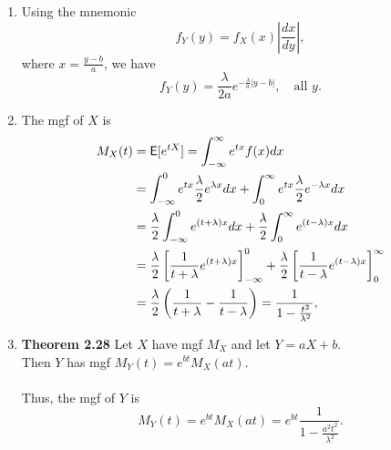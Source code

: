 \documentclass[12pt]{article}
\newcommand{\E}{{\sf E}}
\newenvironment{problem}[2][Problem]{\begin{trivlist}
\item[\hskip \labelsep {\bfseries #1}\hskip \labelsep {\bfseries #2.}]}
{\end{trivlist}}
\begin{document}
\begin{problem}{1}
  \begin{enumerate}
    \item Using the mnemonic
    \[
      f_Y(y) = f_X(x) \left| \frac{dx}{dy} \right|,
    \]
    where $x = \frac{y - b}{a}$, we have
    \[
      f_Y(y) = \frac{\lambda}{2a} e^{-\frac{\lambda}{a} |y - b|}, 
      \quad \text{all } y.
    \]
    \item The mgf of $X$ is 
    \[
      \begin{aligned}
        M_X(t) &= \E[e^{tX}] = \int_{-\infty}^{\infty} e^{tx} f(x) dx \\
        &= \int_{-\infty}^{0} e^{tx} \frac{\lambda}{2} e^{\lambda x} dx + 
        \int_{0}^{\infty} e^{tx} \frac{\lambda}{2} e^{-\lambda x} dx \\
        &= \frac{\lambda}{2} \int_{-\infty}^{0} e^{(t + \lambda)x} dx + 
        \frac{\lambda}{2} \int_{0}^{\infty} e^{(t - \lambda)x} dx \\
        &= \frac{\lambda}{2} \left[ \frac{1}{t + \lambda} 
        e^{(t + \lambda)x} \right]_{-\infty}^{0} + 
        \frac{\lambda}{2} \left[ \frac{1}{t - \lambda} 
        e^{(t - \lambda)x} \right]_{0}^{\infty} \\
        &= \frac{\lambda}{2} \left( \frac{1}{t + \lambda} - 
        \frac{1}{t - \lambda} \right) = \frac{1}{1 - \frac{t^2}{\lambda^2}},
      \end{aligned}
    \]
    \item \textbf{Theorem 2.28} Let $X$ have mgf $M_X$ and let $Y = aX + b$.\\
    Then $Y$ has mgf $M_Y(t) = e^{bt} M_X(at)$.
    \\\\
    Thus, the mgf of $Y$ is 
    \[
      M_Y(t) = e^{bt} M_X(at) = e^{bt} \frac{1}{1 - \frac{a^2 t^2}{\lambda^2}}.
    \]
  \end{enumerate}
\end{problem}
\end{document}
